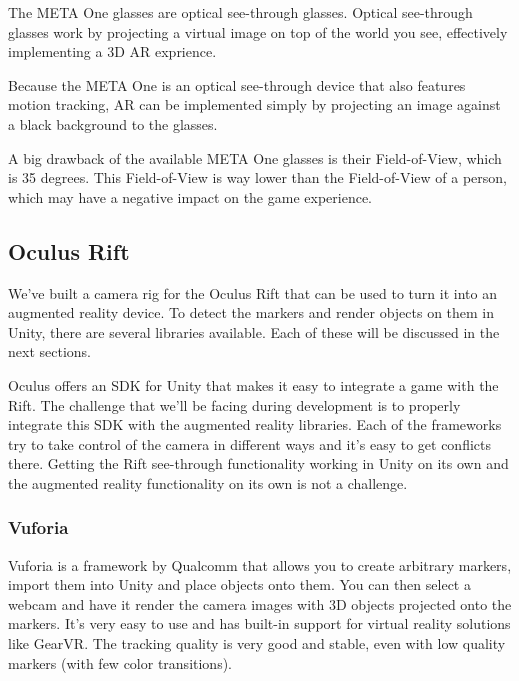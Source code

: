 			The META One glasses are optical see-through glasses. Optical 
			see-through glasses work by projecting a virtual image on top of the
			world you see, effectively implementing a 3D AR exprience.
			
			Because the META One is an optical see-through device that also 
			features motion tracking, AR can be implemented simply by 
			projecting an image against a black background to the glasses.
			
			A big drawback of the available META One glasses is their 
			Field-of-View, which is 35 degrees. This Field-of-View is way lower
			than the Field-of-View of a person, which may have a negative impact 
			on the game experience.
			
		\subsection{Oculus Rift} \label{ssec:oculusrift}
			We've built a camera rig for the Oculus Rift that can be used to
			turn it into an augmented reality device. To detect the markers and
			render objects on them in Unity, there are several libraries
			available. Each of these will be discussed in the next sections.

			Oculus offers an SDK for Unity that makes it easy to integrate a
			game with the Rift. The challenge that we'll be facing during
			development is to properly integrate this SDK with the augmented
			reality libraries. Each of the frameworks try to take control of the
			camera in different ways and it's easy to get conflicts there.
			Getting the Rift see-through functionality working in Unity on its
			own and the augmented reality functionality on its own is not a
			challenge.

			\subsubsection{Vuforia} \label{sssec:vuforia}
				Vuforia is a framework by Qualcomm that allows you to create
				arbitrary markers, import them into Unity and place objects onto
				them. You can then select a webcam and have it render the camera
				images with 3D objects projected onto the markers. It's very
				easy to use and has built-in support for virtual reality
				solutions like GearVR. The tracking quality is very good and
				stable, even with low quality markers (with few color transitions).

